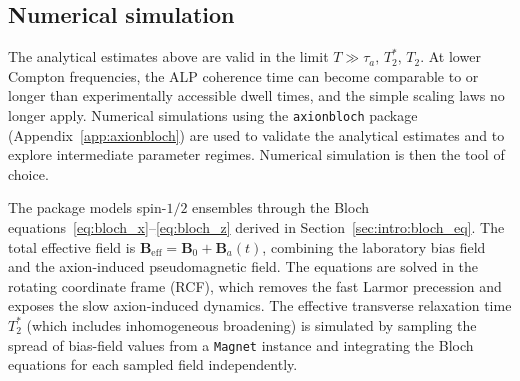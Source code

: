 \subsection{Numerical simulation}\label{sec:theory:simulation}

The analytical estimates above are valid in the limit $T \gg \tau_a,\,T_2^*,\,T_2$.
At lower Compton frequencies, the ALP coherence time can become comparable to or longer than experimentally accessible dwell times, and the simple scaling laws no longer apply.
Numerical simulations using the \texttt{axionbloch} package (Appendix~\ref{app:axionbloch}) are used to validate the analytical estimates and to explore intermediate parameter regimes.
Numerical simulation is then the tool of choice.



The package models spin-$1/2$ ensembles through the Bloch equations~\eqref{eq:bloch_x}--\eqref{eq:bloch_z} derived in Section~\ref{sec:intro:bloch_eq}.
The total effective field is $\boldsymbol{B}_\mathrm{eff} = \boldsymbol{B}_0 + \boldsymbol{B}_a(t)$, combining the laboratory bias field and the axion-induced pseudomagnetic field.
The equations are solved in the rotating coordinate frame (RCF), which removes the fast Larmor precession and exposes the slow axion-induced dynamics.
The effective transverse relaxation time $T_2^*$ (which includes inhomogeneous broadening) is simulated by sampling the spread of bias-field values from a \texttt{Magnet} instance and integrating the Bloch equations for each sampled field independently.


